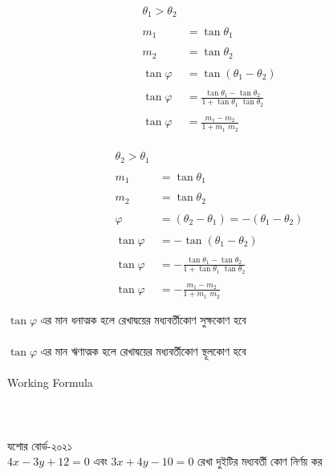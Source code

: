 \documentclass{article}
\begin{document}
\begin{multicols}{2}
	\begin{align*}
	\boxed{\theta_1>\theta_2}&\\
	\\
	m_1&=\tan \theta_1\\
	\\
	m_2&=\tan \theta_2\\
	\\
	\tan \varphi &=\tan(\theta_1-\theta_2)\\
	\\
	\tan \varphi 	&=\frac{\tan \theta_1-\tan \theta_2}{1+\tan \theta_1\,\,\tan \theta_2}\\
	\\
	\tan \varphi 	&=\frac{m_1-m_2}{1+m_1\,\,m_2}
\end{align*}
\\
\begin{align*}
	\boxed{\theta_2>\theta_1}&\\
	\\
	m_1&=\tan \theta_1\\
	\\
	m_2&=\tan \theta_2\\
	\\
	\varphi&=(\theta_2-\theta_1)=-(\theta_1-\theta_2)\\
	\\
	\tan \varphi &=-\tan(\theta_1-\theta_2)\\
	\\
	\tan \varphi 	&=-\frac{\tan \theta_1-\tan \theta_2}{1+\tan \theta_1\,\,\tan\theta_2}\\
	\\
	\tan \varphi 	&=-\frac{m_1-m_2}{1+m_1\,\,m_2}
\end{align*}
\end{multicols}
$\tan \varphi$ এর মান ধনাত্মক হলে রেখাদ্বয়ের মধ্যবর্তীকোণ সুক্ষকোণ হবে\\
\\
$\tan \varphi$ এর মান ঋণাত্মক হলে রেখাদ্বয়ের মধ্যবর্তীকোণ স্থূলকোণ হবে\\
\\
Working Formula\\
\\
\\
\\ 
যশোর বোর্ড-২০২১\\ 
$4x-3y+12=0$ এবং $3x+4y-10=0$ রেখা দুইটির মধ্যবর্তী কোণ নির্ণয় কর\\ 
	\\ 
\end{document}
